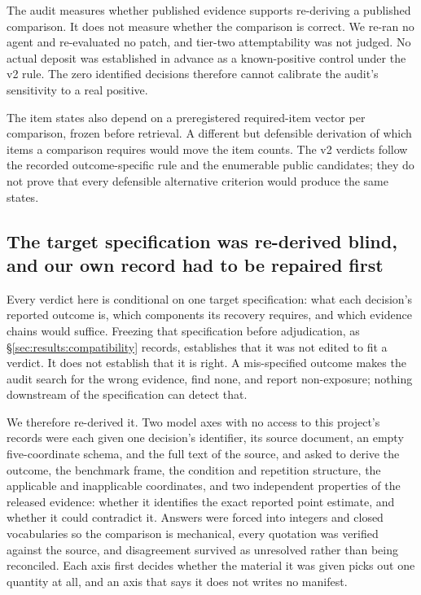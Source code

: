 The audit measures whether published evidence supports re-deriving a published comparison.
It does not measure whether the comparison is correct. We re-ran no agent and re-evaluated
no patch, and tier-two attemptability was not judged. No actual deposit was established in
advance as a known-positive control under the v2 rule. The zero identified decisions therefore
cannot calibrate the audit's sensitivity to a real positive.

The item states also depend on a preregistered required-item vector per comparison, frozen
before retrieval. A different but defensible derivation of which items a comparison requires
would move the item counts. The v2 verdicts follow the recorded outcome-specific rule and the
enumerable public candidates; they do not prove that every defensible alternative criterion
would produce the same states.

\subsection{The target specification was re-derived blind, and our own record had to be
repaired first}

Every verdict here is conditional on one target specification: what each decision's reported
outcome is, which components its recovery requires, and which evidence chains would suffice.
Freezing that specification before adjudication, as \S\ref{sec:results:compatibility} records,
establishes that it was not edited to fit a verdict. It does not establish that it is right. A
mis-specified outcome makes the audit search for the wrong evidence, find none, and report
non-exposure; nothing downstream of the specification can detect that.

We therefore re-derived it. Two model axes with no access to this project's records were each
given one decision's identifier, its source document, an empty five-coordinate schema, and the
full text of the source, and asked to derive the outcome, the benchmark frame, the condition and
repetition structure, the applicable and inapplicable coordinates, and two independent
properties of the released evidence: whether it identifies the exact reported point estimate,
and whether it could contradict it. Answers were forced into integers and closed vocabularies
so the comparison is mechanical, every quotation was verified against the source, and
disagreement survived as unresolved rather than being reconciled. Each axis first decides
whether the material it was given picks out one quantity at all, and an axis that says it does
not writes no manifest.

